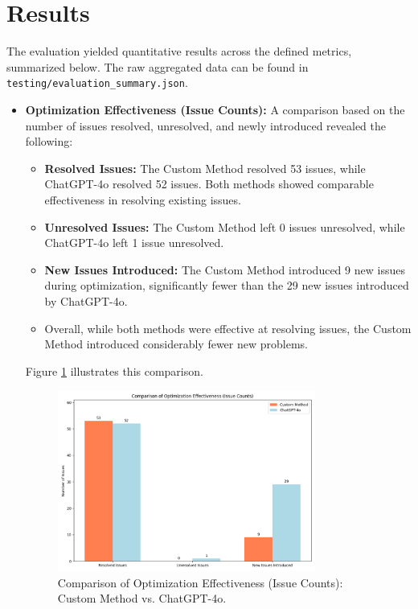 \section{Results}
\label{sec:eval_results}
The evaluation yielded quantitative results across the defined metrics, summarized below. The raw aggregated data can be found in \texttt{testing/evaluation\_summary.json}.
\begin{itemize}
    \item \textbf{Optimization Effectiveness (Issue Counts):} A comparison based on the number of issues resolved, unresolved, and newly introduced revealed the following:
        \begin{itemize}
            \item \textbf{Resolved Issues:} The Custom Method resolved 53 issues, while ChatGPT-4o resolved 52 issues. Both methods showed comparable effectiveness in resolving existing issues.
            \item \textbf{Unresolved Issues:} The Custom Method left 0 issues unresolved, while ChatGPT-4o left 1 issue unresolved.
            \item \textbf{New Issues Introduced:} The Custom Method introduced 9 new issues during optimization, significantly fewer than the 29 new issues introduced by ChatGPT-4o.
            \item Overall, while both methods were effective at resolving issues, the Custom Method introduced considerably fewer new problems.
        \end{itemize}
        Figure \ref{fig:opt_eff} illustrates this comparison.
         \begin{figure}[ht]
            \centering
            \includegraphics[width=0.8\textwidth]{Figures/Picture3_comparisonAI.png}
            \caption{Comparison of Optimization Effectiveness (Issue Counts): Custom Method vs. ChatGPT-4o.}
            \label{fig:opt_eff}
        \end{figure}


\end{itemize}

